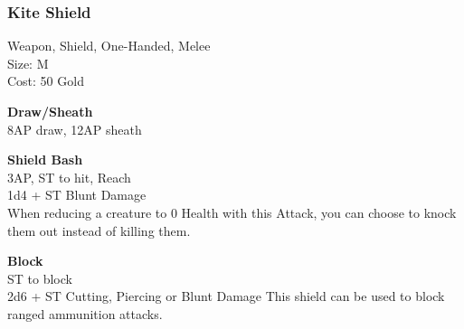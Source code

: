 \subsubsection{Kite Shield}\label{weapon:kiteShield}
Weapon, Shield, One-Handed, Melee\\
Size: M\\
Cost: 50 Gold

\textbf{Draw/Sheath}\\
8AP draw, 12AP sheath

\textbf{Shield Bash}\\
3AP, ST to hit,  Reach\\
1d4 + \texttimes ST Blunt Damage\\
When reducing a creature to 0 Health with this Attack, you can choose to knock them out instead of killing them.

\textbf{Block}\\
ST to block\\
2d6 + \texttimes ST Cutting, Piercing or Blunt Damage
This shield can be used to block ranged ammunition attacks.\\